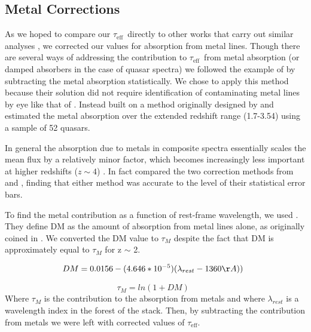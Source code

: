 \documentclass[twocolumn,tight,times]{aastex63}
\newcommand{\mteff}{\tau_\mathrm{eff}}
\newcommand{\teff}{$\mteff$}
\begin{document}
\subsection{Metal Corrections}

As we hoped to compare our \teff\ directly to other works that carry out similar analyses \citep{Schaye_2003, Kirkman_2005, Becker_2013}, we corrected our values for absorption from metal lines. Though there are several ways of addressing the contribution to \teff\ from metal absorption (or damped absorbers in the case of quasar spectra) we followed the example of \cite{Kirkman_2005} by subtracting the
metal absorption statistically. We chose to apply this method because their solution did not require identification of contaminating metal lines by eye like that of \cite{Schaye_2003}. Instead \cite{Kirkman_2005} built on a method originally designed by \cite{Tytler_2004} and estimated the metal absorption over the extended redshift range (1.7-3.54) using a sample of 52 quasars.

In general the absorption due to metals in composite spectra essentially scales the mean flux by a relatively minor factor, which becomes increasingly less important at higher redshifts ($z \sim 4$) \citep{Becker_2013}. In fact \cite{Faucher-Giguere_2008} compared the two correction methods from \cite{Schaye_2003} and \cite{Kirkman_2005}, finding that either method was accurate to the level of their statistical error bars.

To find the metal contribution as a function of rest-frame wavelength, we used \cite[equation 1]{Kirkman_2005}. They define DM as the amount of absorption from metal lines alone, as originally coined in \cite{Tytler_2004}. We converted the DM value to $\tau_{M}$ despite the fact that DM is approximately equal to $\tau_{M}$ for z $\sim$ 2.

\begin{equation}
        DM = 0.0156 - (4.646 * 10^{-5})(\lambda_{rest} - 1360\AA)) \;\;
        \label{eq:DM}
\end{equation}

\begin{equation}
        \tau_{M} = ln(1 + DM) \;\;
        \label{eq:tauM}
\end{equation}
Where $\tau_{M}$ is the contribution to the absorption from metals and where $\lambda_{rest}$ is a wavelength index in the forest of the stack. Then, by subtracting the contribution from metals we were left with corrected values of \teff.
\end{document}

